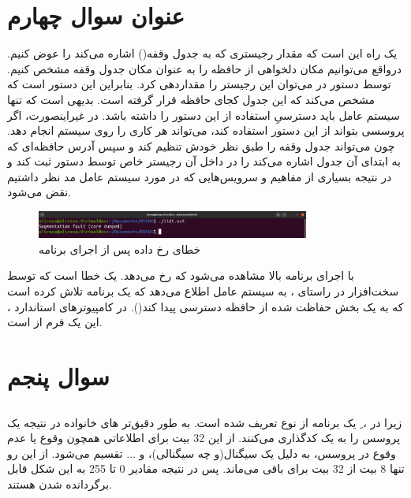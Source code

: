 \documentclass{article}
\begin{document}
\section{عنوان سوال چهارم}
یک راه این است که مقدار رجیستری که به جدول وقفه() اشاره می‌کند را عوض کنیم. درواقع می‌توانیم مکان دلخواهی از حافظه را به عنوان مکان جدول وقفه مشخص کنیم. توسط دستور  در  می‌توان این رجیستر را مقداردهی کرد. بنابراین این دستور است که مشخص می‌کند که این جدول کجای حافظه قرار گرفته است. بدیهی است که تنها سیستم عامل باید دسترسیِ استفاده از این دستور را داشته باشد. در غیراینصورت، اگر پروسسی بتواند از این دستور استفاده کند، می‌تواند هر کاری را روی سیستم انجام دهد. چون می‌تواند جدول وقفه را طبق نظر خودش تنظیم کند و سپس آدرس حافظه‌ای که به ابتدای آن جدول اشاره می‌کند را در داخل آن رجیستر خاص توسط دستور  ثبت کند و در نتیجه بسیاری از مفاهیم و سرویس‌هایی که در مورد سیستم عامل مد نظر داشتیم نقض می‌شود.
\lr{}
\begin{figure}[H]
    \centering
    \includegraphics[width=0.8\textwidth]{figures/4.png}
    \caption{خطای رخ داده پس از اجرای برنامه}
    \label{fig:fig1}
\end{figure}
با اجرای برنامه بالا مشاهده می‌شود که  رخ می‌دهد.  یک خطا است که توسط سخت‌افزار در راستای ، به سیستم عامل اطلاع می‌دهد که یک برنامه تلاش کرده است که به یک بخش حفاظت شده از حافظه دسترسی پیدا کند(). در کامپیوترهای استاندارد ، این یک فرم از  است.

\section{سوال پنجم}
\subsection{}
\lr{}
\subsection{}
زیرا در ، ِ یک برنامه از نوع  تعریف شده است. به طور دقیق‌تر های خانواده  در  نتیجه یک پروسس را به یک  کدگذاری می‌کنند. از این 32 بیت برای اطلاعاتی همچون وقوع یا عدم وقوع  در پروسس،  به دلیل یک سیگنال(و چه سیگنالی)، و $\ldots$ تقسیم می‌شود. از این رو تنها 8 بیت از 32 بیت برای  باقی می‌ماند. پس در نتیجه مقادیر 0 تا 255 به این شکل قابل برگردانده شدن هستند.
\end{document}
